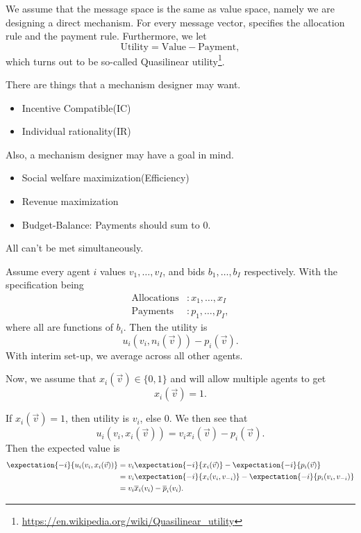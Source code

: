 \hr

We assume that the message space is the same as value space, namely we are designing a direct mechanism. For every message vector, specifies the
allocation rule and the payment rule. Furthermore, we let
\[
	\text{Utility} = \text{Value} - \text{Payment},
\]
which turns out to be so-called Quasilinear utility\footnote{\url{https://en.wikipedia.org/wiki/Quasilinear_utility}}.

\begin{note}
	There are things that a mechanism designer may want.
	\begin{itemize}
		\item Incentive Compatible(IC)
		\item Individual rationality(IR)
	\end{itemize}
	Also, a mechanism designer may have a goal in mind.
	\begin{itemize}
		\item Social welfare maximization(Efficiency)
		\item Revenue maximization
		\item Budget-Balance: Payments should sum to \(0\).
	\end{itemize}

	\begin{remark}
		All can't be met simultaneously.
	\end{remark}
\end{note}

Assume every agent \(i\) values \(v_1, \ldots , v_{I}\), and bids \(b_1, \ldots , b_{I}\) respectively. With the specification being
\[
	\begin{split}
		\text{Allocations}&: x_1, \ldots , x_I\\
		\text{Payments}&:p_1, \ldots , p_I,
	\end{split}
\]
where all are functions of \(b_{i}\). Then the utility is
\[
	u_{i}(v_{i}, n_{i}(\vec{v})) - p_{i}(\vec{v}).
\]
With interim set-up, we average across all other agents.

Now, we assume that \(x_{i}(\vec{v})\in\{0, 1\}\) and will allow multiple agents to get
\[
	x_{i}(\vec{v}) = 1.
\]

If \(x_{i}(\vec{v})=1\), then utility is \(v_{i}\), else \(0\). We then see that
\[
	u_{i}(v_{i}, x_{i}(\vec{v})) = v_{i}x_{i}(\vec{v}) - p_{i}(\vec{v}).
\]
Then the expected value is
\[
	\begin{split}
		\expectation{-i}{u_{i}(v_{i}, x_{i}(\vec{v}))} &= v_{i} \expectation{-i}{x_{i}(\vec{v})} - \expectation{-i}{p_{i}(\vec{v})}\\
		&= v_{i} \expectation{-i}{x_{i}(v_{i}, v_{-i})} - \expectation{-i}{p_{i}(v_{i}, v_{-i})}\\
		&= v_{i} \overline{x}_{i}(v_{i})-\overline{p}_{i}(v_{i}).
	\end{split}
\]

